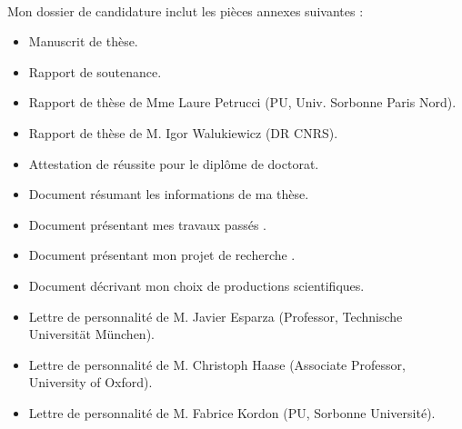 \\

Mon dossier de candidature inclut les pièces annexes suivantes :

\begin{itemize}
	\item Manuscrit de thèse.
	\item Rapport de soutenance.
	\item Rapport de thèse de Mme Laure Petrucci (PU, Univ. Sorbonne Paris Nord).
	\item Rapport de thèse de M. Igor Walukiewicz (DR CNRS).
	\item Attestation de réussite pour le diplôme de doctorat.
	\item Document résumant les informations de ma thèse.
	\item Document présentant mes \og travaux passés \fg.
	\item Document présentant mon \og projet de recherche \fg.
	\item Document décrivant mon choix de productions scientifiques.
	\item Lettre de personnalité de M. Javier Esparza (Professor, Technische Universität München).
	\item Lettre de personnalité de M. Christoph Haase (Associate Professor, University of Oxford).
	\item Lettre de personnalité de M. Fabrice Kordon (PU, Sorbonne Université).
\end{itemize}
